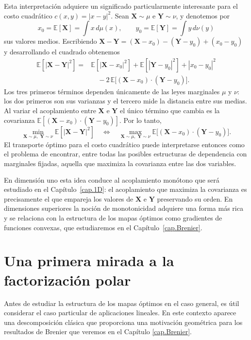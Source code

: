\documentclass[12pt, a4paper]{amsbook}
\theoremstyle{remark}
\theoremstyle{definition}
\numberwithin{section}{chapter}
\numberwithin{subsection}{section}
\numberwithin{equation}{section}
\numberwithin{figure}{chapter}
\begin{document}
Esta interpretación adquiere un significado particularmente interesante para
el costo cuadrático $c(x,y)=|x-y|^2$. Sean $\mathbf{X}\sim\mu$ e
$\mathbf{Y}\sim\nu$, y denotemos por
\[
x_0=\mathbb{E}[\mathbf{X}]=\int x\,d\mu(x),
\qquad
y_0=\mathbb{E}[\mathbf{Y}]=\int y\,d\nu(y)
\]
sus valores medios. Escribiendo
$\mathbf{X}-\mathbf{Y}=(\mathbf{X}-x_0)-(\mathbf{Y}-y_0)+(x_0-y_0)$
y desarrollando el cuadrado obtenemos
\begin{align*}
\mathbb{E}[|\mathbf{X}-\mathbf{Y}|^2]
={}&
\mathbb{E}[|\mathbf{X}-x_0|^2]
+\mathbb{E}[|\mathbf{Y}-y_0|^2]
+|x_0-y_0|^2\\
&\quad
-2\,\mathbb{E}\bigl[(\mathbf{X}-x_0)\cdot(\mathbf{Y}-y_0)\bigr].
\end{align*}
Los tres primeros términos dependen únicamente de las leyes marginales $\mu$
y $\nu$: los dos primeros son sus varianzas y el tercero mide la distancia
entre sus medias. Al variar el acoplamiento entre $\mathbf{X}$ e $\mathbf{Y}$
el único término que cambia es la covarianza
$\mathbb{E}[(\mathbf{X}-x_0)\cdot(\mathbf{Y}-y_0)]$. Por lo tanto,
\[
\min_{\mathbf{X}\sim\mu,\;\mathbf{Y}\sim\nu}
\mathbb{E}[|\mathbf{X}-\mathbf{Y}|^2]
\quad\Longleftrightarrow\quad
\max_{\mathbf{X}\sim\mu,\;\mathbf{Y}\sim\nu}
\mathbb{E}\bigl[(\mathbf{X}-x_0)\cdot(\mathbf{Y}-y_0)\bigr].
\]
El transporte óptimo para el costo cuadrático puede interpretarse entonces
como el problema de encontrar, entre todas las posibles estructuras de
dependencia con marginales fijadas, aquella que maximiza la covarianza entre
las dos variables.

En dimensión uno esta idea conduce al acoplamiento monótono que será estudiado en el
Capítulo~\ref{cap.1D}: el acoplamiento que maximiza la covarianza es
precisamente el que empareja los valores de $\mathbf{X}$ e $\mathbf{Y}$
preservando su orden. En dimensiones superiores la noción de monotonicidad
adquiere una forma más rica y se relaciona con la estructura de los mapas
óptimos como gradientes de funciones convexas, que estudiaremos en el
Capítulo~\ref{cap.Brenier}.

\section{Una primera mirada a la factorización polar}

Antes de estudiar la estructura de los mapas óptimos en el caso general,
es útil considerar el caso particular de aplicaciones lineales. En este
contexto aparece una descomposición clásica que proporciona una motivación
geométrica para los resultados de Brenier que veremos en el Capítulo \ref{cap.Brenier}.
\end{document}
